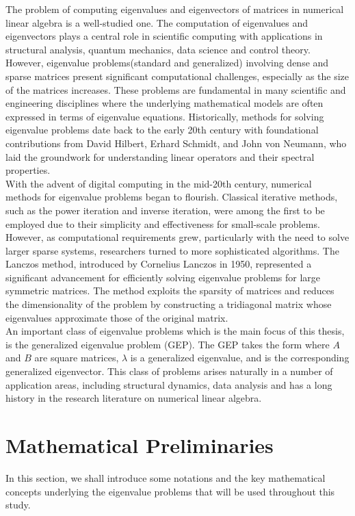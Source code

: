 \documentclass[12pt,gsu,online,openany,singleside,hidelinks]{gsudiss}
\newcommand{\rep}[2]{\replaced{#1}{#2}}
\begin{document}
The problem of computing eigenvalues and eigenvectors of matrices in numerical linear algebra is a well-studied one. The computation of eigenvalues and eigenvectors plays a central role in scientific computing with applications in structural analysis, quantum mechanics, data science and control theory. However, eigenvalue problems(standard and generalized)  involving dense and sparse matrices present significant computational challenges, especially as the size of the matrices increases. These problems are fundamental in many scientific and engineering disciplines where the underlying mathematical models are often expressed in terms of eigenvalue equations. Historically, methods for solving eigenvalue problems date back to the early 20th century with foundational contributions from David Hilbert, Erhard Schmidt, and John von Neumann, who laid the groundwork for understanding linear operators and their spectral properties.\\
With the advent of digital computing in the mid-20th century, numerical methods for eigenvalue problems began to flourish. Classical iterative methods, such as the power iteration and inverse iteration, were among the first to be employed due to their simplicity and effectiveness for small-scale problems. However, as computational requirements grew, particularly with the need to solve larger sparse systems, researchers turned to more sophisticated algorithms. The Lanczos method, introduced by Cornelius Lanczos in 1950,
represented a significant advancement for efficiently solving eigenvalue problems for large symmetric matrices. The method exploits the sparsity of matrices and reduces the dimensionality of the problem by constructing a tridiagonal matrix whose eigenvalues approximate those of the original matrix.\\
An important class of eigenvalue problems which is the main focus of this thesis, is the generalized eigenvalue problem\added[comment={use a space here}]{} (GEP). The GEP takes the form \rep{$A\mathbf{v} = \lambda B\mathbf{v}$}{$Av=\lambda Bv$} where $A$ and $B$ are square matrices, $\lambda$ is a generalized eigenvalue, and \rep{$\mathbf{v}\neq\mathbf{0}$}{$v$} is the corresponding generalized eigenvector. This class of problems arises naturally in a number of application areas, including structural dynamics, data analysis and has a long history in the research literature on numerical linear algebra.
\section{Mathematical Preliminaries}
In this section, we shall introduce some notations and the key mathematical concepts underlying the eigenvalue problems that will be used throughout this study.
\end{document}
